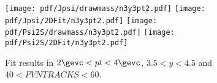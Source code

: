 \begin{figure}[H]
\begin{center}
\texttt{[image: pdf/Jpsi/drawmass/n3y3pt2.pdf]}
\texttt{[image: pdf/Jpsi/2DFit/n3y3pt2.pdf]}
\vspace*{-0.5cm}
\texttt{[image: pdf/Psi2S/drawmass/n3y3pt2.pdf]}
\texttt{[image: pdf/Psi2S/2DFit/n3y3pt2.pdf]}
\vspace*{-0.5cm}
\end{center}
\caption{Fit results in $2\gevc<pt<4\gevc$, $3.5<y<4.5$ and $40<PVNTRACKS<60$.}
\label{Fitn3y3pt2}
\end{figure}
